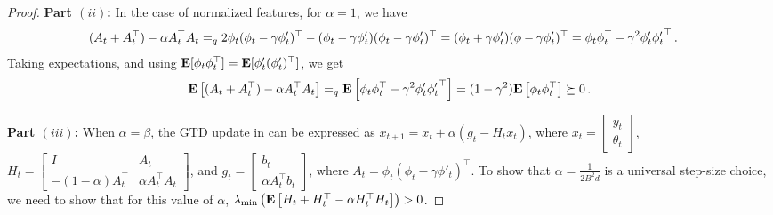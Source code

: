 \begin{proof}
\textbf{Part $(ii)$:}
In the case of normalized features, for $\alpha=1$, we have
\begin{align*}
\MoveEqLeft
(A_t+A_t^\top) -\alpha A_t^\top A_t 
\qfeq 2\phi_t(\phi_t-\gamma\phi'_t)^\top - (\phi_t-\gamma\phi'_t)(\phi_t-\gamma\phi'_t)^\top
=(\phi_t+\gamma\phi'_t)(\phi-\gamma\phi'_t)^\top
=\phi_t\phi_t^\top-\gamma^2\phi'_t{\phi'_t}^\top\,.
\end{align*}
Taking expectations, and using $\mathbf{E}[ \phi_t \phi_t^\top ] = \mathbf{E}[ \phi_t' (\phi_t')^\top ]$, we get
\begin{align*}
\mathbf{E}\left[(A_t+A_t^\top) -\alpha A_t^\top A_t \right] =_q \mathbf{E}\left[\phi_t\phi_t^\top-\gamma^2\phi'_t{\phi'_t}^\top\right]
=(1-\gamma^2)\mathbf{E}\left[\phi_t\phi_t^\top\right]
\succeq 0\,.
\end{align*}

\textbf{Part $(iii)$:}
When $\alpha=\beta$,
the GTD update in  can be expressed as $x_{t+1}=x_t+\alpha (g_t -H_t x_t)$, where $x_t=\left[\begin{matrix}y_t\\\theta_t\end{matrix}\right]$, 
	$H_t=
		\left[\begin{matrix}
			I &A_t \\ 
			-(1-\alpha)A^\top_t & \alpha A_t^\top A_t
		\end{matrix}\right]$, 
and $g_t=\left[\begin{matrix} b_t\\ \alpha A_t^\top b_t\end{matrix}\right]$, where $A_t=\phi_t(\phi_t-\gamma \phi'_t)^\top$. To show that $\alpha=\frac{1}{2B^2 d}$ is a universal step-size choice, 
we need to show that for this value of $\alpha$, 
$\lambda_{\min}\left( \mathbf{E}\left[ H_t + H_t^\top - \alpha H_t^\top H_t \right] \right)>0$.


\end{proof}
